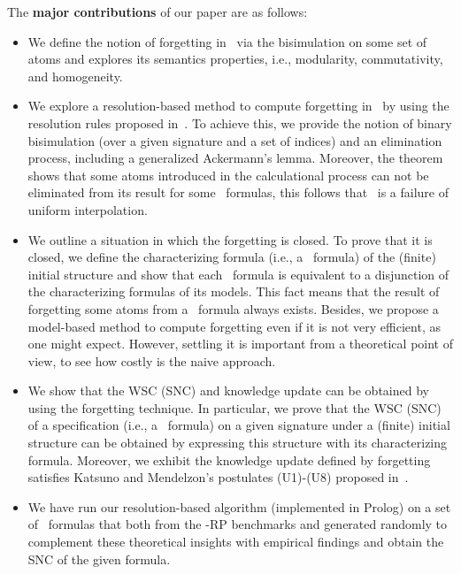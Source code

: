 \documentclass[twoside,11pt]{article}
\begin{document}
The \textbf{major contributions} of our paper are as follows:
\begin{itemize}
	\item We define the notion of forgetting in \CTL\ via the bisimulation on some set of atoms and explores its semantics properties, i.e., modularity, commutativity, and homogeneity.
	\item We explore a resolution-based method to compute forgetting in \CTL\ by using the resolution rules proposed in~\cite{zhang2014resolution}.
	To achieve this, we provide the notion of binary bisimulation (over a given signature and a set of indices) and an elimination process, including a generalized Ackermann’s lemma.
	Moreover, the theorem shows that some atoms introduced in the calculational process can not be eliminated from its result for some \CTL\ formulas, this follows that \CTL\ is a failure of uniform interpolation.
	\item We outline a situation in which the forgetting is closed. To prove that it is closed, we define the characterizing formula (i.e., a \CTL\ formula) of the (finite) initial structure and show that each \CTL\ formula is equivalent to a disjunction of the characterizing formulas of its models.  This fact means that the result of forgetting some atoms from a \CTL\ formula always exists. Besides, we propose a model-based method to compute forgetting even if it is not very efficient, as one might expect. However, settling it is important from a theoretical point of view, to see how costly is the naive approach.
	\item We show that the WSC (SNC) and knowledge update can be obtained by using the forgetting technique. In particular, we prove that the WSC (SNC) of a specification (i.e., a \CTL\ formula) on a given signature under a (finite) initial structure can be obtained by expressing this structure with its characterizing formula. Moreover, we exhibit  the knowledge update defined by forgetting satisfies Katsuno and Mendelzon's postulates (U1)-(U8) proposed in~\cite{katsuno91mendelzon}.
	\item We have run our resolution-based algorithm (implemented in Prolog) on a set of \CTL\ formulas that both from the \CTL-RP benchmarks and generated randomly to complement these theoretical insights with empirical findings and obtain the SNC of the given formula.
\end{itemize}
\end{document}

